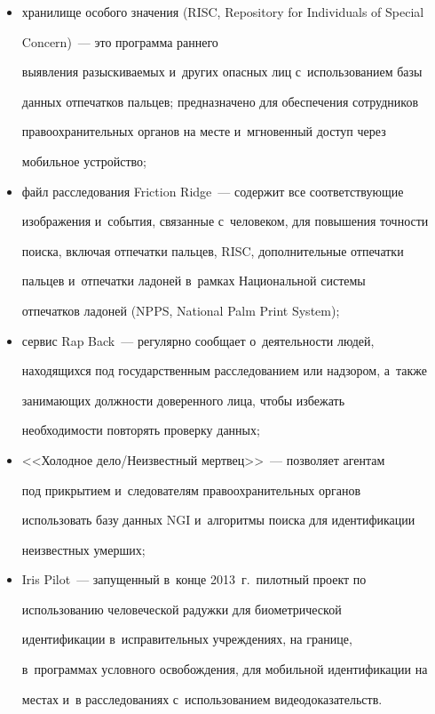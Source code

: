   \begin{itemize}


\item хранилище особого значения (RISC, Repository for Individuals of Special


Concern)~--- это программа раннего


выявления разыскиваемых и~других опасных лиц с~использованием базы


данных отпечатков пальцев; предназначено для обеспечения сотрудников


правоохранительных органов на месте и~мгновенный доступ через


мобильное устройство;


\item файл расследования Friction Ridge~--- содержит все соответствующие


изображения и~события, связанные с~человеком, для повышения точности


поиска, вклю\-чая отпечатки пальцев, RISC, дополнительные отпечатки


пальцев и~отпечатки ладоней в~рамках Национальной системы


отпечатков ладоней (NPPS, National Palm Print System);


\item сервис Rap Back~--- регулярно сообщает о~деятельности людей,


находящихся под государственным расследованием или надзором, а~также


занимающих должности доверенного лица, чтобы избежать


необходимости повторять проверку данных;


\item <<Холодное дело/Не\-из\-вест\-ный мертвец>>~--- позволяет агентам


под прикрытием и~следователям правоохранительных органов


использовать базу данных NGI и~алгоритмы поиска для идентификации


неизвестных умерших;


\item Iris Pilot~--- запущенный в~конце 2013~г.\ пилотный проект по


использованию человеческой радужки для биометрической


идентификации в~исправительных учреждениях, на границе,


в~программах условного освобождения, для мобильной идентификации на


местах и~в расследованиях с~использованием видеодоказательств.


  \end{itemize}


